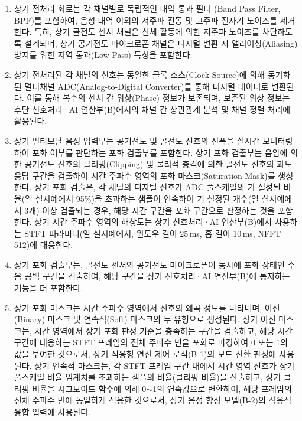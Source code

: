 \documentclass{article}
\begin{document}
\begin{enumerate}[label = \textbf{(A.2.\arabic*)}]

    \item 상기 전처리 회로는 각 채널별로 독립적인 대역 통과 필터 (Band Pass Filter, BPF)를 포함하여, 음성 대역 이외의 저주파 진동 및 고주파 전자기 노이즈를 제거한다. 
    특히, 상기 골전도 센서 채널은 신체 활동에 의한 저주파 노이즈를 차단하도록 설계되며, 상기 공기전도 마이크로폰 채널은 디지털 변환 시 앨리어싱(Aliasing) 방지를 위한 저역 통과(Low Pass) 특성을 포함한다.

    \item 상기 전처리된 각 채널의 신호는 동일한 클록 소스(Clock Source)에 의해 동기화된 멀티채널 ADC(Analog-to-Digital Converter)를 통해 디지털 데이터로 변환된다. 
    이를 통해 복수의 센서 간 위상(Phase) 정보가 보존되며, 보존된 위상 정보는 후단 신호처리·AI 연산부(B)에서의 채널 간 상관관계 분석 및 채널 정렬 처리에 활용된다.

    \item 상기 멀티모달 음성 입력부는 공기전도 및 골전도 신호의 진폭을 실시간 모니터링하여 포화 여부를 판단하는 포화 검출부를 포함한다. 
    상기 포화 검출부는 음압에 의한 공기전도 신호의 클리핑(Clipping) 및 물리적 충격에 의한 골전도 신호의 과도 응답 구간을 검출하여 시간-주파수 영역의 포화 마스크(Saturation Mask)를 생성한다. 상기 포화 검출은, 각 채널의 디지털 신호가 ADC 풀스케일의 기 설정된 비율(일 실시예에서 95\%)을 초과하는 샘플이 연속하여 기 설정된 개수(일 실시예에서 3개) 이상 검출되는 경우, 해당 시간 구간을 포화 구간으로 판정하는 것을 포함한다. 상기 시간-주파수 영역의 해상도는 상기 신호처리·AI 연산부(B)에서 사용하는 STFT 파라미터(일 실시예에서, 윈도우 길이 25\,ms, 홉 길이 10\,ms, NFFT 512)에 대응한다.

    \item 상기 포화 검출부는, 골전도 센서와 공기전도 마이크로폰이 동시에 포화 상태인 수음 공백 구간을 검출하여, 해당 구간을 상기 신호처리·AI 연산부(B)에 통지하는 기능을 더 포함한다.

    \item 상기 포화 마스크는 시간-주파수 영역에서 신호의 왜곡 정도를 나타내며, 이진(Binary) 마스크 및 연속적(Soft) 마스크의 두 유형으로 생성된다. 상기 이진 마스크는, 시간 영역에서 상기 포화 판정 기준을 충족하는 구간을 검출하고, 해당 시간 구간에 대응하는 STFT 프레임의 전체 주파수 빈을 포화로 마킹하여 0 또는 1의 값을 부여한 것으로서, 상기 적응형 연산 제어 로직(B-1)의 모드 전환 판정에 사용된다. 상기 연속적 마스크는, 각 STFT 프레임 구간 내에서 시간 영역 신호가 상기 풀스케일 비율 임계치를 초과하는 샘플의 비율(클리핑 비율)을 산출하고, 상기 클리핑 비율을 시그모이드 함수에 의해 0$\sim$1의 연속값으로 변환하여, 해당 프레임의 전체 주파수 빈에 동일하게 적용한 것으로서, 상기 음성 향상 모델(B-2)의 적응적 융합 입력에 사용된다.

\end{enumerate}
\end{document}
